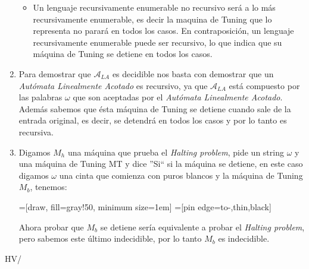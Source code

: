 \documentclass[spanish, fleqn]{article}
\begin{document}
\begin{enumerate}
\begin{itemize}
			\item
				Un lenguaje recursivamente enumerable no recursivo será a lo
				más recursivamente enumerable, es decir la maquina de Tuning que
				lo representa no parará en todos los casos. En contraposición,
				un lenguaje recursivamente enumerable puede ser recursivo, lo
				que indica que su máquina de Tuning se detiene en todos los
				casos.
		\end{itemize}

	\item
		Para demostrar que $\mathcal{A}_{LA}$ es decidible nos basta con
		demostrar que un \emph{Autómata Linealmente Acotado} es recursivo, ya
		que $\mathcal{A}_{LA}$ está compuesto por las palabras $\omega$ que son
		aceptadas por el \emph{Autómata Linealmente Acotado}. Además sabemos que
		ésta máquina de Tuning se detiene cuando sale de la entrada original,
		es decir, se detendrá en todos los casos y por lo tanto es recursiva.
	
	\item
		Digamos $M_h$ una máquina que prueba el \emph{Halting problem}, pide un
		string $\omega$ y una máquina de Tuning MT y dice ''Si`` si la máquina
		se detiene, en este caso digamos $\omega$ una cinta que comienza con
		puros blancos y la máquina de Tuning $M_b$,	tenemos:

		=[draw, fill=gray!50, minimum size=1em]
		=[pin edge={to-,thin,black}]
		\begin{center}
		\end{center}
		Ahora probar que $M_b$ se detiene sería equivalente a probar el
		\emph{Halting problem}, pero sabemos este último indecidible, por lo
		tanto $M_b$ es indecidible.

\end{enumerate}
\vfill\hfill HV/\LaTeXe
\end{document}
